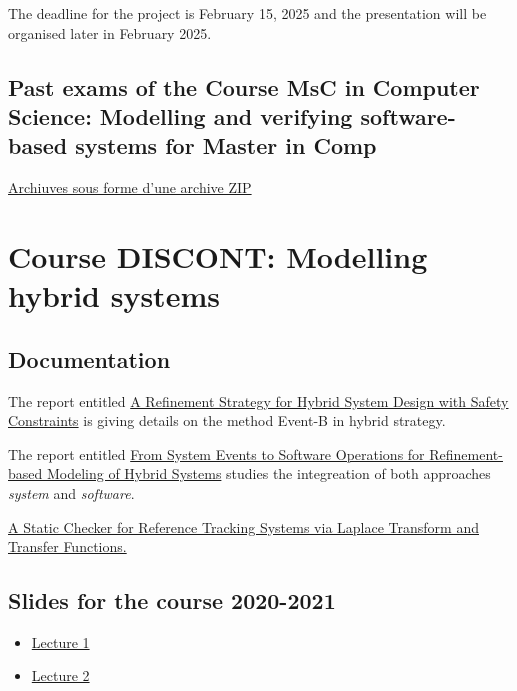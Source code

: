 \documentclass[ 12pt]{article}
\begin{document}
The deadline for the project is  February 15, 2025 and the presentation
will be  organised later in February 2025. 



\subsection{Past exams  of  the  Course MsC in Computer Science: Modelling and verifying software-based systems for Master in Comp}
\label{sec:past-exams-course}


\href{http://mery54.github.io/teaching/mosos/lecturesnotes/annales-master2425.zip}{Archiuves
sous forme d'une archive ZIP}


\hrulefill




\section{Course DISCONT: Modelling hybrid systems}
\label{sec:course-discont}


\subsection{Documentation}
\label{sec:documentation}



The report entitled \href{https://inria.hal.science/hal-02895528v1
}{A Refinement Strategy for Hybrid System Design with Safety
  Constraints} is giving details on the method Event-B in hybrid
strategy.


The report entitled 
\href{https://hal.science/hal-04189025v2
}{From System Events to Software Operations for Refinement-based
  Modeling of Hybrid Systems}  studies the integreation of both
approaches  \textit{system} and \textit{software}.


\href{https://hal.science/hal-04152829v1
  }{A Static Checker for Reference Tracking Systems via Laplace Transform and Transfer Functions.}





\subsection{Slides for the course 2020-2021}

\begin{itemize}
\item[]  
  \href{http://mery54.github.io/teaching/mosos/lecturesnotes/2021-01-MLS-00.pdf}{Lecture
    1 }
\item[]  
  \href{http://mery54.github.io/teaching/mosos/lecturesnotes/2021-01-MLS-01.pdf}{Lecture
    2 }
\end{itemize}
\end{document}

